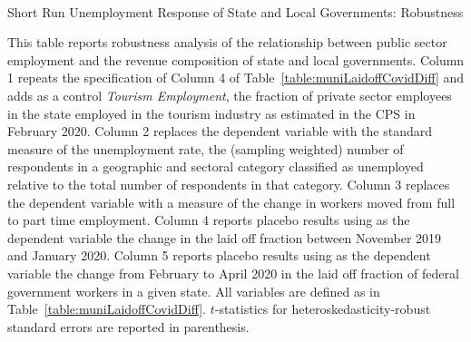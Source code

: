 \begin{landscape}
\begin{table}[!ht]
\begin{center}
\begin{threeparttable}

\caption{\\ Short Run Unemployment Response of State and Local Governments: Robustness}
\label{table:muniLaidoffRobustness}

\centering 

\begin{small}

	

\end{small}

\begin{footnotesize}
\begin{tablenotes}
\item This table reports robustness analysis of the relationship between public sector employment and the revenue composition of state and local governments. Column 1 repeats the specification of Column 4 of Table~\ref{table:muniLaidoffCovidDiff} and adds as a control \emph{Tourism Employment}, the fraction of private sector employees in the state employed in the tourism industry as estimated in the CPS in February 2020. Column 2 replaces the dependent variable with the standard measure of the unemployment rate, the (sampling weighted) number of respondents in a geographic and sectoral category classified as unemployed relative to the total number of respondents in that category. Column 3 replaces the dependent variable with a measure of the change in workers moved from full to part time employment. Column 4 reports placebo results using as the dependent variable the change in the laid off fraction between November 2019 and January 2020. Column 5 reports placebo results using as the dependent variable the change from February to April 2020 in the laid off fraction of federal government workers in a given state. All variables are defined as in Table~\ref{table:muniLaidoffCovidDiff}. $t$-statistics for heteroskedasticity-robust standard errors are reported in parenthesis. 

\end{tablenotes}
\end{footnotesize}
\end{threeparttable}
\end{center}
\end{table}
\thispagestyle{empty}
\end{landscape}


